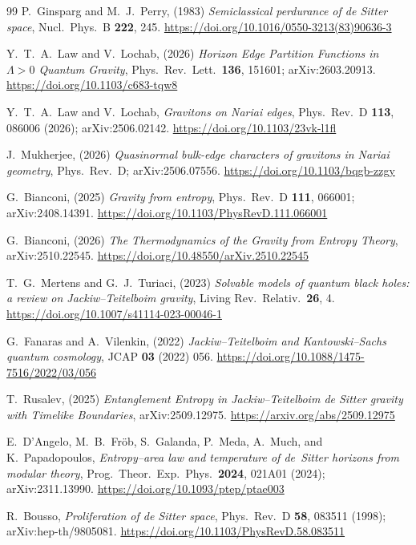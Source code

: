 \documentclass[11pt]{article}
\begin{document}
\begin{thebibliography}{99}
 P.~Ginsparg and M.~J.~Perry, (1983) \emph{Semiclassical perdurance of de Sitter space}, Nucl.\ Phys.\ B \textbf{222}, 245.
\url{https://doi.org/10.1016/0550-3213(83)90636-3}

 Y.~T.~A.~Law and V.~Lochab, (2026) \emph{Horizon Edge Partition Functions in $\Lambda>0$ Quantum Gravity}, Phys.\ Rev.\ Lett.\ \textbf{136}, 151601; arXiv:2603.20913.
\url{https://doi.org/10.1103/c683-tqw8}

 Y.~T.~A.~Law and V.~Lochab, \emph{Gravitons on Nariai edges}, Phys.\ Rev.\ D \textbf{113}, 086006 (2026); arXiv:2506.02142.
\url{https://doi.org/10.1103/23vk-l1fl}

 J.~Mukherjee, (2026) \emph{Quasinormal bulk-edge characters of gravitons in Nariai geometry}, Phys.\ Rev.\ D; arXiv:2506.07556.
\url{https://doi.org/10.1103/bqgb-zzgy}

 G.~Bianconi, (2025) \emph{Gravity from entropy}, Phys.\ Rev.\ D \textbf{111}, 066001; arXiv:2408.14391. 
\newline
\url{https://doi.org/10.1103/PhysRevD.111.066001}

 G.~Bianconi, (2026) \emph{The Thermodynamics of the Gravity from Entropy Theory}, arXiv:2510.22545.
\newline \url{https://doi.org/10.48550/arXiv.2510.22545}

 T.~G.~Mertens and G.~J.~Turiaci, (2023) \emph{Solvable models of quantum black holes: a review on Jackiw--Teitelboim gravity}, Living Rev.\ Relativ.\ \textbf{26}, 4.
\url{https://doi.org/10.1007/s41114-023-00046-1}

 G.~Fanaras and A.~Vilenkin, (2022) \emph{Jackiw--Teitelboim and Kantowski--Sachs quantum cosmology}, JCAP \textbf{03} (2022) 056.
\url{https://doi.org/10.1088/1475-7516/2022/03/056}

 T.~Rusalev, (2025) \emph{Entanglement Entropy in Jackiw--Teitelboim de Sitter gravity with Timelike Boundaries}, arXiv:2509.12975. \url{https://arxiv.org/abs/2509.12975}


 E.~D'Angelo, M.~B.~Fr\"ob, S.~Galanda, P.~Meda, A.~Much, and K.~Papadopoulos, \emph{Entropy--area law and temperature of de~Sitter horizons from modular theory}, Prog.\ Theor.\ Exp.\ Phys.\ \textbf{2024}, 021A01 (2024); arXiv:2311.13990. \url{https://doi.org/10.1093/ptep/ptae003}

 R.~Bousso, \emph{Proliferation of de Sitter space}, Phys.\ Rev.\ D \textbf{58}, 083511 (1998); arXiv:hep-th/9805081. 
\newline
\url{https://doi.org/10.1103/PhysRevD.58.083511}


\end{thebibliography}
\end{document}

